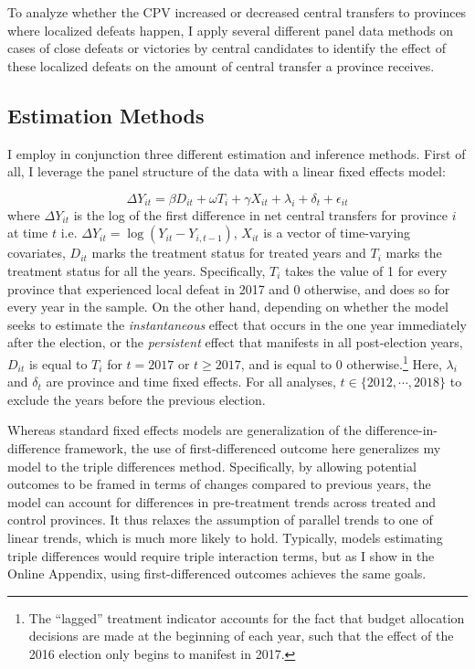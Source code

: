 \documentclass[12pt]{article}
\newcommand{\1}{\mathbbm{1}}
\begin{document}
To analyze whether the CPV increased or decreased central transfers to provinces where localized defeats happen, I apply several different panel data methods on cases of close defeats or victories by central candidates to identify the effect of these localized defeats on the amount of central transfer a province receives.

\subsection{Estimation Methods}
\label{sec:methods_estimation}
I employ in conjunction three different estimation and inference methods. First of all, I leverage the panel structure of the data with a linear fixed effects model:

\begin{equation}
\Delta Y_{it} = \beta D_{it} + \omega T_{i} + \gamma X_{it} + \lambda_i + \delta_t + \epsilon_{it} \label{eq:FE}
\end{equation}
where $\Delta Y_{it}$ is the log of the first difference in net central transfers for province $i$ at time $t$ i.e. $\Delta Y_{it} = \log(Y_{it} - Y_{i, t-1})$, $X_{it}$ is a vector of time-varying covariates, $D_{it}$ marks the treatment status for treated years and $T_{i}$ marks the treatment status for all the years. Specifically, $T_{i}$ takes the value of 1 for every province that experienced local defeat in 2017 and 0 otherwise, and does so for every year in the sample. On the other hand, depending on whether the model seeks to estimate the \textit{instantaneous} effect that occurs in the one year immediately after the election, or the \textit{persistent} effect that manifests in all post-election years, $D_{it}$ is equal to $T_{i}$ for $t=2017$ or $t\geq2017$, and is equal to $0$ otherwise.\footnote{The ``lagged'' treatment indicator accounts for the fact that budget allocation decisions are made at the beginning of each year, such that the effect of the 2016 election only begins to manifest in 2017.} Here, $\lambda_i$ and $\delta_t$ are province and time fixed effects. For all analyses, $t \in \{2012, \cdots, 2018\}$ to exclude the years before the previous election.

Whereas standard fixed effects models are generalization of the difference-in-difference framework, the use of first-differenced outcome here generalizes my model to the triple differences method. Specifically, by allowing potential outcomes to be framed in terms of changes compared to previous years, the model can account for differences in pre-treatment trends across treated and control provinces. It thus relaxes the assumption of parallel trends to one of linear trends, which is much more likely to hold. Typically, models estimating triple differences would require triple interaction terms, but as I show in the Online Appendix, using first-differenced outcomes achieves the same goals. 
\end{document}
